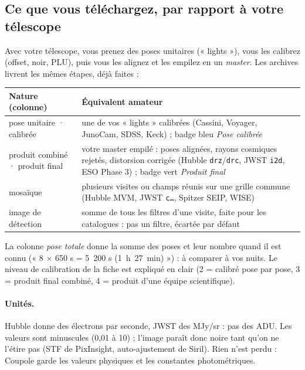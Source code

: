 \subsection{Ce que vous téléchargez, par rapport à votre télescope}
Avec votre télescope, vous prenez des poses unitaires (« lights »), vous les calibrez (offset, noir, PLU), puis vous
les alignez et les empilez en un \emph{master}. Les archives livrent les mêmes étapes, déjà faites :
\begin{center}\small
\begin{tabularx}{\linewidth}{@{}lX@{}}
\toprule
\textbf{Nature (colonne)} & \textbf{Équivalent amateur}\\
\midrule
pose unitaire · calibrée & une de vos « lights » calibrées (Cassini, Voyager, JunoCam, SDSS, Keck) ; badge bleu \emph{Pose calibrée}\\
produit combiné · produit final & votre master empilé : poses alignées, rayons cosmiques rejetés, distorsion corrigée (Hubble \texttt{drz}/\texttt{drc}, JWST \texttt{i2d}, ESO Phase 3) ; badge vert \emph{Produit final}\\
mosaïque & plusieurs visites ou champs réunis sur une grille commune (Hubble MVM, JWST \texttt{c…}, Spitzer SEIP, WISE)\\
image de détection & somme de tous les filtres d'une visite, faite pour les catalogues : pas un filtre, écartée par défaut\\
\bottomrule
\end{tabularx}
\end{center}
La colonne \emph{pose totale} donne la somme des poses et leur nombre quand il est connu (« 8 × 650 s = 5~200 s
(1~h~27~min) ») : à comparer à vos nuits. Le niveau de calibration de la fiche est expliqué en clair (2 = calibré
pose par pose, 3 = produit final combiné, 4 = produit d'une équipe scientifique).

\paragraph{Unités.} Hubble donne des électrons par seconde, JWST des MJy/sr : pas des ADU. Les valeurs sont
minuscules (0,01 à 10) ; l'image paraît donc noire tant qu'on ne l'étire pas (STF de PixInsight, auto-ajustement de
Siril). Rien n'est perdu : Coupole garde les valeurs physiques et les constantes photométriques.

